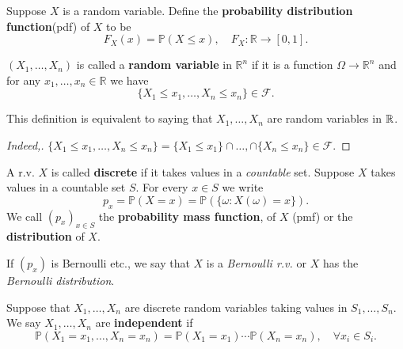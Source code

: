 \begin{definition}
    Suppose $X$ is a random variable. Define the \textbf{probability distribution function}(pdf) of $X$ to be 
    \[
        F_X(x) = \mathbb{P}(X\le x),\quad F_X: \mathbb{R} \to [0,1].
    \]
\end{definition}

\begin{definition}
    $ (X_1,\dots,X_n) $ is called a \textbf{random variable} in $ \mathbb{R}^{n} $ if it is a function $\Omega\to \mathbb{R}^{n}$ and for any $ x_1,\dots,x_n\in \mathbb{R}  $ we have 
    \[
        \{X_1\le x_1,\dots,X_n\le x_n\} \in \mathscr{F}.
    \]
\end{definition}

\begin{claim}
    This definition is equivalent to saying that $ X_1,\dots,X_n $ are random variables in ${\mathbb{R}}$.
\end{claim}
\begin{proof}[Indeed,]
    $ \{X_1\le x_1,\dots,X_n\le x_n\} = \{X_1\le x_1\}\cap\dots,\cap \{X_n\le x_n \} \in \mathscr{F}$.
\end{proof}

\begin{definition}
    A r.v. $X$ is called \textbf{discrete} if it takes values in a \textit{countable} set.
    Suppose $X$ takes values in a countable set $S$. For every $x\in S$ we write
    \[
        p_x=\mathbb{P}(X=x) = \mathbb{P}(\{\omega:X(\omega)=x\}).
    \]
    We call $ (p_x)_{x\in S} $ the \textbf{probability mass function}, of $X$ (pmf) or the \textbf{distribution} of $X$.
\end{definition}

\begin{note}
    If $(p_x)$ is Bernoulli etc., we say that $X$ is a \textit{Bernoulli r.v.} or $X$ has the \textit{Bernoulli distribution}.
\end{note}

\begin{definition}
    Suppose that $X_1,\dots,X_n$ are discrete random variables taking values in $S_1,\dots,S_n$. We say $X_1,\dots,X_n$ are \textbf{independent} if 
    \[
        \mathbb{P}(X_1=x_1,\dots,X_n=x_n)=\mathbb{P}(X_1=x_1)\cdots \mathbb{P}(X_n=x_n), \quad \forall x_i\in S_i.
    \]
\end{definition}

